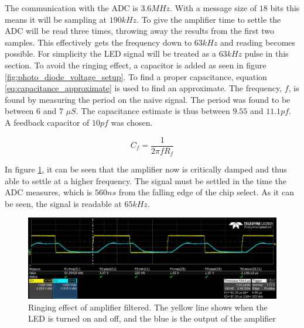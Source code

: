 The communication with the ADC is $3.6 MHz$. 
With a message size of $18$ bits this means it will be sampling at $190 kHz$.
To give the amplifier time to settle the ADC will be read three times, throwing away the results from the first two samples.
This effectively gets the frequency down to $63 kHz$ and reading becomes possible.
For simplicity the LED signal will be treated as a $63 kHz$ pulse in this section.
% 
To avoid the ringing effect, a capacitor is added as seen in figure \ref{fig:photo_diode_voltage_setup}.
To find a proper capacitance, equation \ref{eq:capacitance_approximate}\cite[p. 2]{art:cap}
is used to find an approximate.
The frequency, $f$, is found by measuring the period on the naive signal.
The period was found to be between $6$ and $7$ $\mu S$.
The capacitance estimate is thus between $9.55$ and $11.1 pf$. 
A feedback capacitor of $10 pf$ was chosen.

\begin{equation}
 C_f = \frac{1}{2 \pi f R_f} \label{eq:capacitance_approximate}
\end{equation}

In figure \ref{fig::scope_op_amp_with_C}, it can be seen that the amplifier now is critically damped and thus able to settle at a higher frequency.
The signal must be settled in the time the ADC measures, which is $560 ns$ from the falling edge of the chip select.
As it can be seen, the signal is readable at $65 kHz$.


\begin{figure}[h]
\centering
\includegraphics[width=0.9\linewidth]{img/ringing_test_filtered_rise.jpg}
\caption[Ringing effect of amplifier filtered.]{Ringing effect of amplifier filtered. The yellow line shows when the LED is turned on and off, and the blue is the output of the amplifier}
\label{fig::scope_op_amp_with_C}
\end{figure}

